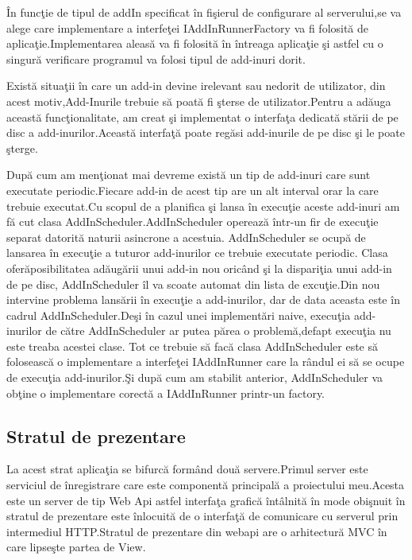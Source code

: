 \documentclass[a4paper,12pt]{report}
\begin{document}
\^In func\c tie de tipul de addIn specificat \^in fi\c sierul de configurare al serverului,se va alege care implementare a 
interfe\c tei IAddInRunnerFactory va fi folosit\u a de aplica\c tie.Implementarea aleas\u a va fi folosit\u a \^in \^intreaga
aplica\c tie  \c si astfel cu o singur\u a verificare programul va folosi tipul de add-inuri dorit.

Exist\u a situa\c tii \^in care un add-in devine irelevant sau nedorit de utilizator, din acest motiv,Add-Inurile trebuie 
s\u a poat\u a fi \c sterse de utilizator.Pentru a ad\u auga aceast\u a func\c tionalitate, am creat \c si implementat o
 interfa\c ta dedicat\u a st\u arii de pe disc a add-inurilor.Aceast\u a interfa\c t\u a poate reg\u asi add-inurile de pe disc
 \c si le poate \c sterge.

 Dup\u a cum am men\c tionat mai devreme exist\u a un tip de add-inuri care sunt executate periodic.Fiecare add-in de acest tip 
 are un alt interval orar la care trebuie executat.Cu scopul de a planifica \c si lansa \^in execu\c tie aceste add-inuri am f\u a cut
 clasa AddInScheduler.AddInScheduler opereaz\u a \^intr-un fir de execu\c tie separat datorit\u a naturii asincrone a acestuia.
  AddInScheduler se ocup\u a de lansarea \^in execu\c tie a tuturor add-inurilor ce trebuie executate periodic.
 Clasa ofer\u aposibilitatea ad\u aug\u arii unui add-in nou oric\^and \c si la dispari\c tia unui add-in de pe disc, AddInScheduler
 \^il va scoate automat din lista de excu\c tie.Din nou intervine problema lans\u arii \^in execu\c tie a add-inurilor,
 dar de data aceasta este \^in cadrul AddInScheduler.De\c si \^in cazul unei implement\u ari naive, execu\c tia add-inurilor
 de c\u atre AddInScheduler ar putea p\u area o problem\u a,defapt execu\c tia nu este treaba acestei clase.
 Tot ce trebuie s\u a fac\u a clasa AddInScheduler este s\u a foloseasc\u a o implementare a interfe\c tei IAddInRunner 
 care la r\^andul ei s\u a se ocupe de execu\c tia add-inurilor.\c Si dup\u a cum am stabilit anterior, AddInScheduler
 va ob\c tine o implementare corect\u a a IAddInRunner printr-un factory. 

\subsection{Stratul de prezentare}

La acest strat aplica\c tia se bifurc\u a form\^and dou\u a servere.Primul server este serviciul de \^inregistrare
care este component\u a principal\u a a proiectului meu.Acesta este un server de tip Web Api astfel interfa\c ta grafic\u a
\^int\^alnit\u a \^in mode obi\c snuit \^in stratul de prezentare este \^inlocuit\u a de o interfa\c t\u a de comunicare
cu serverul prin intermediul HTTP.Stratul de prezentare din webapi are o arhitectur\u a MVC \^in care lipse\c ste partea
de View.
\end{document}
